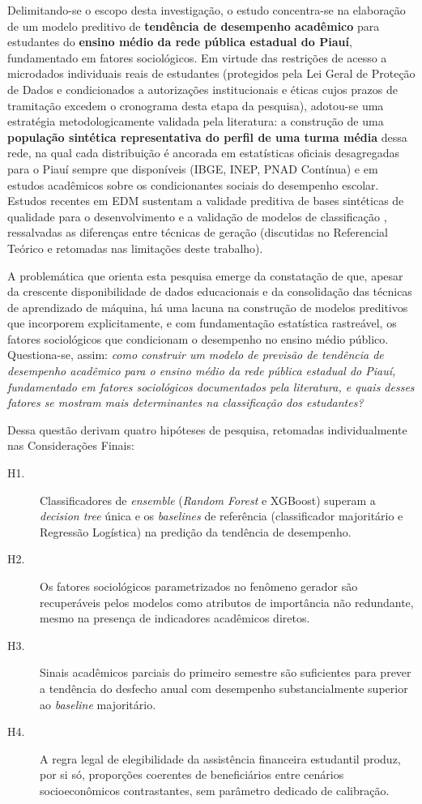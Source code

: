 Delimitando-se o escopo desta investigação, o estudo concentra-se na elaboração de um modelo preditivo de \textbf{tendência de desempenho acadêmico} para estudantes do \textbf{ensino médio da rede pública estadual do Piauí}, fundamentado em fatores sociológicos. Em virtude das restrições de acesso a microdados individuais reais de estudantes (protegidos pela Lei Geral de Proteção de Dados e condicionados a autorizações institucionais e éticas cujos prazos de tramitação excedem o cronograma desta etapa da pesquisa), adotou-se uma estratégia metodologicamente validada pela literatura: a construção de uma \textbf{população sintética representativa do perfil de uma turma média} dessa rede, na qual cada distribuição é ancorada em estatísticas oficiais desagregadas para o Piauí sempre que disponíveis (IBGE, INEP, PNAD Contínua) e em estudos acadêmicos sobre os condicionantes sociais do desempenho escolar. Estudos recentes em EDM sustentam a validade preditiva de bases sintéticas de qualidade para o desenvolvimento e a validação de modelos de classificação \cite{kostopoulos2026, shabnam2025}, ressalvadas as diferenças entre técnicas de geração (discutidas no Referencial Teórico e retomadas nas limitações deste trabalho).

A problemática que orienta esta pesquisa emerge da constatação de que, apesar da crescente disponibilidade de dados educacionais e da consolidação das técnicas de aprendizado de máquina, há uma lacuna na construção de modelos preditivos que incorporem explicitamente, e com fundamentação estatística rastreável, os fatores sociológicos que condicionam o desempenho no ensino médio público. Questiona-se, assim: \textit{como construir um modelo de previsão de tendência de desempenho acadêmico para o ensino médio da rede pública estadual do Piauí, fundamentado em fatores sociológicos documentados pela literatura, e quais desses fatores se mostram mais determinantes na classificação dos estudantes?}

Dessa questão derivam quatro hipóteses de pesquisa, retomadas individualmente nas Considerações Finais:

\begin{description}
    \item[H1.] Classificadores de \textit{ensemble} (\textit{Random Forest} e XGBoost) superam a \textit{decision tree} única e os \textit{baselines} de referência (classificador majoritário e Regressão Logística) na predição da tendência de desempenho.
    \item[H2.] Os fatores sociológicos parametrizados no fenômeno gerador são recuperáveis pelos modelos como atributos de importância não redundante, mesmo na presença de indicadores acadêmicos diretos.
    \item[H3.] Sinais acadêmicos parciais do primeiro semestre são suficientes para prever a tendência do desfecho anual com desempenho substancialmente superior ao \textit{baseline} majoritário.
    \item[H4.] A regra legal de elegibilidade da assistência financeira estudantil produz, por si só, proporções coerentes de beneficiários entre cenários socioeconômicos contrastantes, sem parâmetro dedicado de calibração.
\end{description}

